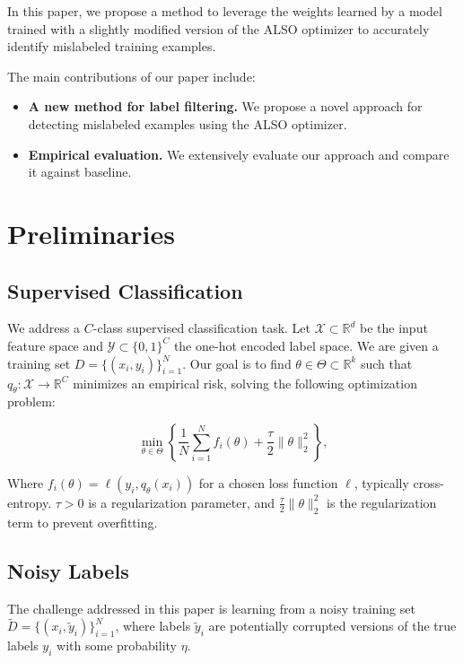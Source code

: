 \documentclass[12pt]{article}
\begin{document}
In this paper, we propose a method to leverage the weights learned by a model trained with a slightly modified version of the ALSO optimizer to accurately identify mislabeled training examples.

The main contributions of our paper include:
\begin{itemize}
    \item \textbf{A new method for label filtering.} We propose a novel approach for detecting mislabeled examples using the ALSO optimizer.
    \item \textbf{Empirical evaluation.} We extensively evaluate our approach and compare it against baseline.
\end{itemize}

\section{Preliminaries}

\subsection{Supervised Classification}
We address a $C$-class supervised classification task.
Let $\mathcal{X} \subset \mathbb{R}^d$ be the input feature space and $\mathcal{Y} \subset \{0,1\}^C$ the one-hot encoded label space. We are given a training set $D = \{(x_i, y_i)\}_{i=1}^N$. Our goal is to find $\theta \in \Theta \subset \mathbb{R}^k$ such that $q_\theta: \mathcal{X} \to \mathbb{R}^C$ minimizes an empirical risk, solving the following optimization problem:

\begin{equation}
    \min_{\theta \in \Theta} \left\{
        \frac{1}{N}\sum_{i=1}^{N} f_i(\theta) + \frac{\tau}{2}\|\theta\|_2^2
    \right\},
    \label{eq:empirical}
\end{equation}

Where $f_i(\theta) = \ell(y_i, q_\theta(x_i))$ for a chosen loss function $\ell$, typically cross-entropy. \(\tau > 0\) is a regularization parameter, and \(\frac{\tau}{2}\|\theta\|_2^2\) is the regularization term to prevent overfitting.

\subsection{Noisy Labels}
The challenge addressed in this paper is learning from a noisy training set $\tilde{D} = \{(x_i, \tilde{y}_i)\}_{i=1}^N$, where labels $\tilde{y}_i$ are potentially corrupted versions of the true labels $y_i$ with some probability $\eta$.
\end{document}
